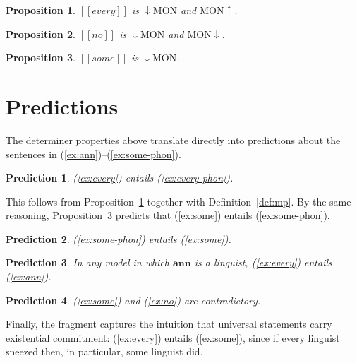 \documentclass{article}
\newtheorem{proposition}{Proposition}
\newtheorem{prediction}{Prediction}
\newcommand{\sem}[1]{[\![#1]\!]}
\begin{document}
\begin{proposition}\label{prop:every-mon}
$\sem{\textit{every}}$ is ${\downarrow}\mathrm{MON}$ and $\mathrm{MON}{\uparrow}$.
\end{proposition}

\begin{proposition}\label{prop:no-mon}
$\sem{\textit{no}}$ is ${\downarrow}\mathrm{MON}$ and $\mathrm{MON}{\downarrow}$.
\end{proposition}

\begin{proposition}\label{prop:some-mon}
$\sem{\textit{some}}$ is ${\downarrow}\mathrm{MON}$.
\end{proposition}

\section{Predictions}

The determiner properties above translate directly into predictions about
the sentences in (\ref{ex:ann})--(\ref{ex:some-phon}).

\begin{prediction}\label{pred:every-phon}
(\ref{ex:every}) entails (\ref{ex:every-phon}).
\end{prediction}

This follows from Proposition~\ref{prop:every-mon} together with
Definition~\ref{def:mp}. By the same reasoning, Proposition~\ref{prop:some-mon}
predicts that (\ref{ex:some}) entails (\ref{ex:some-phon}).

\begin{prediction}\label{pred:some-phon-up}
(\ref{ex:some-phon}) entails (\ref{ex:some}).
\end{prediction}

\begin{prediction}\label{pred:instantiation}
In any model in which $\mathbf{ann}$ is a linguist, (\ref{ex:every}) entails
(\ref{ex:ann}).
\end{prediction}

\begin{prediction}\label{pred:contradictory}
(\ref{ex:some}) and (\ref{ex:no}) are contradictory.
\end{prediction}

Finally, the fragment captures the intuition that universal statements
carry existential commitment: (\ref{ex:every}) entails (\ref{ex:some}), since
if every linguist sneezed then, in particular, some linguist did.
\end{document}
